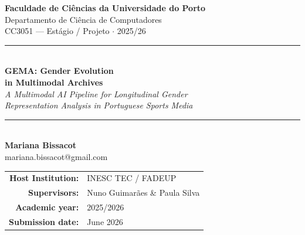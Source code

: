\documentclass[11pt,a4paper]{article}
\begin{document}

\begin{titlepage}
  \centering
  \vspace*{1cm}
  {\Large\bfseries Faculdade de Ciências da Universidade do Porto\\}
  \vspace{0.3cm}
  {\large Departamento de Ciência de Computadores\\}
  \vspace{0.3cm}
  {\normalsize CC3051 — Estágio / Projeto $\cdot$ 2025/26\\}
  \vspace{1.5cm}
  \rule{\textwidth}{0.5pt}\\[0.5cm]
  {\LARGE\bfseries GEMA: Gender Evolution\\[0.4em] in Multimodal Archives\\}
  \vspace{0.4cm}
  {\large\itshape A Multimodal AI Pipeline for Longitudinal Gender\\
  Representation Analysis in Portuguese Sports Media\\}
  \rule{\textwidth}{0.5pt}\\[1.5cm]
  {\large\bfseries Mariana Bissacot\\}
  \vspace{0.2cm}
  {\normalsize mariana.bissacot@gmail.com\\}
  \vspace{1.2cm}
  \begin{tabular}{rl}
    \textbf{Host Institution:} & INESC TEC / FADEUP \\[3pt]
    \textbf{Supervisors:}      & Nuno Guimarães \& Paula Silva \\[3pt]
    \textbf{Academic year:}    & 2025/2026 \\[3pt]
    \textbf{Submission date:}  & June 2026 \\
  \end{tabular}
\end{titlepage}
\end{document}
